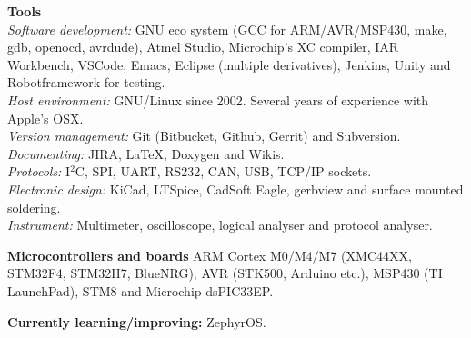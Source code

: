 \documentclass[a4paper,margin,line]{res} \usepackage{latexsym}
\begin{document}
\begin{resume}
{\bf Tools}\\ {\em Software development:} GNU eco system (GCC for
ARM/AVR/MSP430, make, gdb, openocd, avrdude), Atmel Studio,
Microchip's XC compiler, IAR Workbench, VSCode, Emacs, Eclipse
(multiple derivatives), Jenkins, Unity and Robotframework for testing.
\\ {\em Host environment:} GNU/Linux since 2002. Several years of
experience with Apple's OSX.\\ {\em Version management:} Git
(Bitbucket, Github, Gerrit) and Subversion. \\ {\em Documenting:}
JIRA, \LaTeX, Doxygen and Wikis. \\ {\em Protocols:} I$^2$C, SPI,
UART, RS232, CAN, USB, TCP/IP sockets.\\ {\em Electronic design:}
KiCad, LTSpice, CadSoft Eagle, gerbview and surface mounted
soldering. \\ {\em Instrument:} Multimeter, oscilloscope, logical
analyser and protocol analyser.


{\bf Microcontrollers and boards} ARM Cortex M0/M4/M7 (XMC44XX, STM32F4, 
STM32H7, Blue\-NRG), AVR (STK500, Arduino etc.), MSP430 (TI
LaunchPad), STM8 and Microchip dsPIC33EP.

{\bf Currently learning/improving:} ZephyrOS.






\end{resume}
\end{document}
